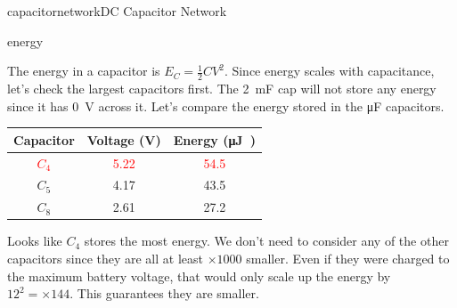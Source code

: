 \begin{mainquestion}{capacitornetwork}{DC Capacitor Network}
\begin{partquestion}{energy}
\begin{answer}
    The energy in a capacitor is $E_C = \frac{1}{2}CV^2$. Since energy scales with capacitance, let's check the largest capacitors first. The \qty{2}{\milli\farad} cap will not store any energy since it has \qty{0}{\volt} across it. Let's compare the energy stored in the \unit{\micro\farad} capacitors.

    \begin{table} [h]
    \centering
    \begin{tabular}{| c | c | c |}
        \hline
        Capacitor & Voltage (V) & Energy (\unit{\micro\joule)} \\ \hline
        \textcolor{red}{$C_{4}$} & \textcolor{red}{5.22} & \textcolor{red}{54.5}\\
        $C_{5}$ & 4.17 & 43.5\\
        $C_{8}$ & 2.61 & 27.2\\
        \hline
    \end{tabular}
\end{table}

Looks like $C_4$ stores the most energy. We don't need to consider any of the other capacitors since they are all at least $\times1000$ smaller. Even if they were charged to the maximum battery voltage, that would only scale up the energy by $12^2 = \times144$. This guarantees they are smaller.

    
\end{answer}
\end{partquestion}

\end{mainquestion}
